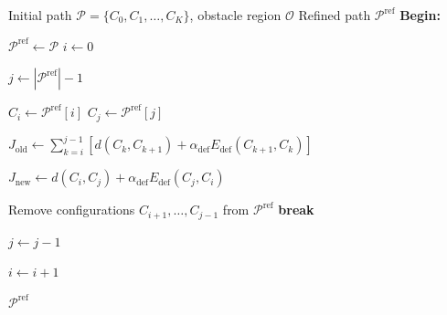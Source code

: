 \documentclass{pas}
\begin{document}
\begin{algorithm}[t]
\small
\caption{Shortcut Refinement}
\label{alg:gcr_refine}
\begin{algorithmic}[1]
\Require Initial path \(\mathcal{P}=\{C_0,C_1,\ldots,C_K\}\), obstacle region
\(\mathcal{O}\)
\Ensure Refined path \(\mathcal{P}^{\mathrm{ref}}\)
\Statex \textbf{Begin:}

\State \(\mathcal{P}^{\mathrm{ref}}\gets\mathcal{P}\)
\State \(i\gets0\)

    \State \(j\gets |\mathcal{P}^{\mathrm{ref}}|-1\)

        \State \(C_i\gets \mathcal{P}^{\mathrm{ref}}[i]\)
        \State \(C_j\gets \mathcal{P}^{\mathrm{ref}}[j]\)

        \State \(J_{\mathrm{old}}\gets
        \displaystyle\sum_{k=i}^{j-1}
        \left[
        d(C_k,C_{k+1})
        +\alpha_{\mathrm{def}}E_{\mathrm{def}}(C_{k+1},C_k)
        \right]\)

        \State \(J_{\mathrm{new}}\gets
        d(C_i,C_j)+\alpha_{\mathrm{def}}E_{\mathrm{def}}(C_j,C_i)\)

            \State Remove configurations \(C_{i+1},\ldots,C_{j-1}\) from
            \(\mathcal{P}^{\mathrm{ref}}\)
            \State \textbf{break}
        \EndIf

        \State \(j\gets j-1\)
    \EndWhile

    \State \(i\gets i+1\)
\EndWhile

\State \Return \(\mathcal{P}^{\mathrm{ref}}\)

\end{algorithmic}
\end{algorithm}




\end{document}
